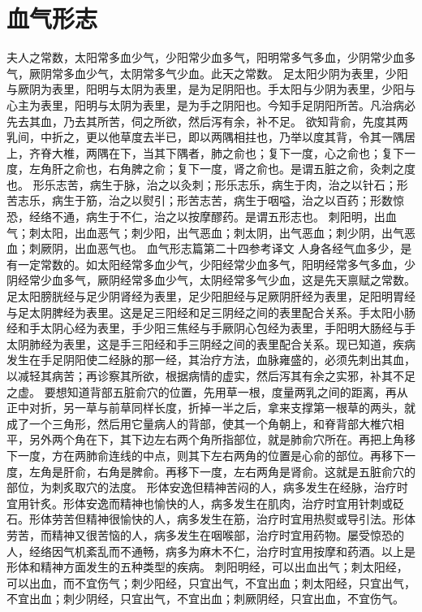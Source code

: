\documentclass[a4paper,12pt,UTF8,twoside]{ctexbook}
\begin{document}
\chapter{血气形志}

夫人之常数，太阳常多血少气，少阳常少血多气，阳明常多气多血，少阴常少血多气，厥阴常多血少气，太阴常多气少血。此天之常数。
足太阳少阴为表里，少阳与厥阴为表里，阳明与太阴为表里，是为足阴阳也。手太阳与少阴为表里，少阳与心主为表里，阳明与太阴为表里，是为手之阴阳也。今知手足阴阳所苦。凡治病必先去其血，乃去其所苦，伺之所欲，然后泻有余，补不足。
欲知背俞，先度其两乳间，中折之，更以他草度去半已，即以两隅相拄也，乃举以度其背，令其一隅居上，齐脊大椎，两隅在下，当其下隅者，肺之俞也；复下一度，心之俞也；复下一度，左角肝之俞也，右角脾之俞；复下一度，肾之俞也。是谓五脏之俞，灸刺之度也。
形乐志苦，病生于脉，治之以灸刺；形乐志乐，病生于肉，治之以针石；形苦志乐，病生于筋，治之以熨引；形苦志苦，病生于咽嗌，治之以百药；形数惊恐，经络不通，病生于不仁，治之以按摩醪药。是谓五形志也。
刺阳明，出血气；刺太阳，出血恶气；刺少阳，出气恶血；刺太阴，出气恶血；刺少阴，出气恶血；刺厥阴，出血恶气也。
血气形志篇第二十四参考译文
人身各经气血多少，是有一定常数的。如太阳经常多血少气，少阳经常少血多气，阳明经常多气多血，少阴经常少血多气，厥阴经常多血少气，太阴经常多气少血，这是先天禀赋之常数。
足太阳膀胱经与足少阴肾经为表里，足少阳胆经与足厥阴肝经为表里，足阳明胃经与足太阴脾经为表里。这是足三阳经和足三阴经之间的表里配合关系。手太阳小肠经和手太阴心经为表里，手少阳三焦经与手厥阴心包经为表里，手阳明大肠经与手太阴肺经为表里，这是手三阳经和手三阴经之间的表里配合关系。现已知道，疾病发生在手足阴阳使二经脉的那一经，其治疗方法，血脉雍盛的，必须先刺出其血，以减轻其病苦；再诊察其所欲，根据病情的虚实，然后泻其有余之实邪，补其不足之虚。
要想知道背部五脏俞穴的位置，先用草一根，度量两乳之间的距离，再从正中对折，另一草与前草同样长度，折掉一半之后，拿来支撑第一根草的两头，就成了一个三角形，然后用它量病人的背部，使其一个角朝上，和脊背部大椎穴相平，另外两个角在下，其下边左右两个角所指部位，就是肺俞穴所在。再把上角移下一度，方在两肺俞连线的中点，则其下左右两角的位置是心俞的部位。再移下一度，左角是肝俞，右角是脾俞。再移下一度，左右两角是肾俞。这就是五脏俞穴的部位，为刺炙取穴的法度。
形体安逸但精神苦闷的人，病多发生在经脉，治疗时宜用针炙。形体安逸而精神也愉快的人，病多发生在肌肉，治疗时宜用针刺或砭石。形体劳苦但精神很愉快的人，病多发生在筋，治疗时宜用热熨或导引法。形体劳苦，而精神又很苦恼的人，病多发生在咽喉部，治疗时宜用药物。屡受惊恐的人，经络因气机紊乱而不通畅，病多为麻木不仁，治疗时宜用按摩和药酒。以上是形体和精神方面发生的五种类型的疾病。
刺阳明经，可以出血出气；刺太阳经，可以出血，而不宜伤气；刺少阳经，只宜出气，不宜出血；刺太阳经，只宜出气，不宜出血；刺少阴经，只宜出气，不宜出血；刺厥阴经，只宜出血，不宜伤气。
\end{document}
